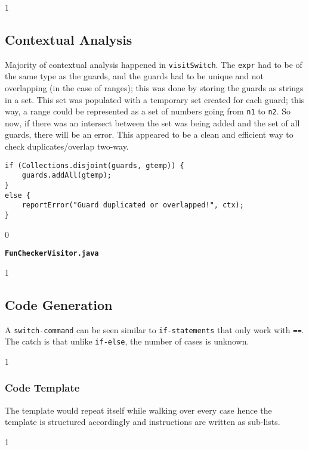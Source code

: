 \documentclass{article}
\newcommand{\code}[1]{\texttt{#1}}
\newenvironment{codelst}{\captionsetup{type=listing}}{}
\newcommand{\dividestages}{0}
\newcommand{\showcontextcode}{1}
\newcommand{\showtemplate}{0}
\newcommand{\stage}[1]{
    \if\dividestages1
        \vspace{0.5cm}
        \subsection{#1}
    \fi
}
\newcommand{\act}[1]{
    \if\dividestages1
        \subsubsection{#1}
    \fi
}
\newcommand{\codecaption}[1]{
    \if\dividestages0
        \vspace{-0.75cm}
        \caption{\textbf{#1}}
        \vspace{0.4cm}
    \fi
}
\begin{document}

\stage{Contextual Analysis}

\noindent Majority of contextual analysis happened in \code{visitSwitch}. The \code{expr} had to be of the same type as the guards, and the guards had to be unique and not overlapping (in the case of ranges); this was done by storing the guards as strings in a set. This set was populated with a temporary set created for each guard; this way, a range could be represented as a set of numbers going from \code{n1} to \code{n2}. So now, if there was an intersect between the set was being added and the set of all guards, there will be an error. This appeared to be a clean and efficient way to check duplicates/overlap two-way.

\vspace{0.5cm}

\begin{codelst}
\begin{verbatim}
if (Collections.disjoint(guards, gtemp)) {
	guards.addAll(gtemp);
}
else {
	reportError("Guard duplicated or overlapped!", ctx);
}
\end{verbatim}
\codecaption{\code{FunCheckerVisitor.java}}
\end{codelst}


\stage{Code Generation}

\noindent A \code{switch-command} can be seen similar to \code{if-statements} that only work with \code{==}. The catch is that unlike \code{if-else}, the number of cases is unknown.

\vspace{1cm}

\act{Code Template}

\noindent The template would repeat itself while walking over every case hence the template is structured accordingly and instructions are written as sub-lists.

\if\showtemplate1

\vspace{0.5cm}
\end{document}
